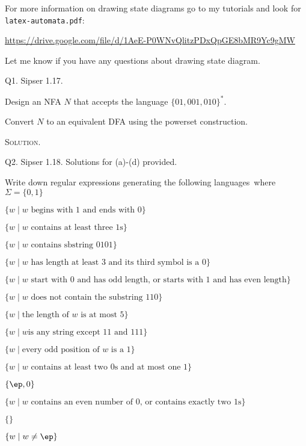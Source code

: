 For more information on drawing state diagrams go to my tutorials and
look for \verb!latex-automata.pdf!:
\begin{center}
{\small \url{https://drive.google.com/file/d/1AeE-P0WNvQlitzPDxQpGE8bMR9Yc9gMW}}
\end{center}
Let me know if you have any questions about drawing state diagram.

\newpage
Q1. Sipser 1.17.

\begin{myenum}
\item Design an NFA $N$ that accepts the language $\{01, 001, 010\}^*$.
\item Convert $N$ to an equivalent DFA using the powerset construction.
\end{myenum}

\textsc{Solution}.



\newpage
Q2. Sipser 1.18. Solutions for (a)-(d) provided.

Write down regular expressions generating the following languages\
where $\Sigma = \{0, 1\}$
\begin{myenum}
\item $\{w \mid w \text{ begins with 1 and ends with 0}\}$
\item $\{w \mid w \text{ contains at least three $1$s}\}$
\item $\{w \mid w \text{ contains sbstring 0101}\}$
\item $\{w \mid w \text{ has length at least 3 and its third symbol is a 0}\}$
\item $\{w \mid w \text{ start with 0 and has odd length, or starts with 1 and has even length}\}$
\item $\{w \mid w \text{ does not contain the substring 110}\}$
\item $\{w \mid \text{the length of $w$ is at most 5}\}$
\item $\{w \mid w \text{is any string except 11 and 111}\}$
\item $\{w \mid \text{every odd position of $w$ is a 1}\}$
\item $\{w \mid w \text{ contains at least two 0s and at most one 1}\}$
\item $\{\ep, 0\}$
\item $\{w \mid w \text{ contains an even number of 0, or contains exactly two 1s}\}$
\item $\{\}$
\item $\{w \mid w \neq \ep\}$
\end{myenum}

